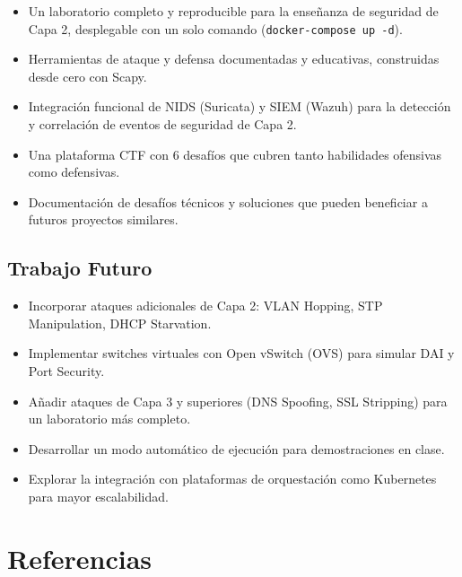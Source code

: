 \documentclass[12pt, a4paper]{article}
\begin{document}
\begin{itemize}[leftmargin=2cm]
    \item Un laboratorio completo y reproducible para la ense\~nanza de seguridad de Capa 2, desplegable con un solo comando (\texttt{docker-compose up -d}).
    \item Herramientas de ataque y defensa documentadas y educativas, construidas desde cero con Scapy.
    \item Integraci\'on funcional de NIDS (Suricata) y SIEM (Wazuh) para la detecci\'on y correlaci\'on de eventos de seguridad de Capa 2.
    \item Una plataforma CTF con 6 desaf\'ios que cubren tanto habilidades ofensivas como defensivas.
    \item Documentaci\'on de desaf\'ios t\'ecnicos y soluciones que pueden beneficiar a futuros proyectos similares.
\end{itemize}

\subsection{Trabajo Futuro}

\begin{itemize}[leftmargin=2cm]
    \item Incorporar ataques adicionales de Capa 2: VLAN Hopping, STP Manipulation, DHCP Starvation.
    \item Implementar switches virtuales con Open vSwitch (OVS) para simular DAI y Port Security.
    \item A\~nadir ataques de Capa 3 y superiores (DNS Spoofing, SSL Stripping) para un laboratorio m\'as completo.
    \item Desarrollar un modo autom\'atico de ejecuci\'on para demostraciones en clase.
    \item Explorar la integraci\'on con plataformas de orquestaci\'on como Kubernetes para mayor escalabilidad.
\end{itemize}

\newpage

\section{Referencias}
\end{document}
